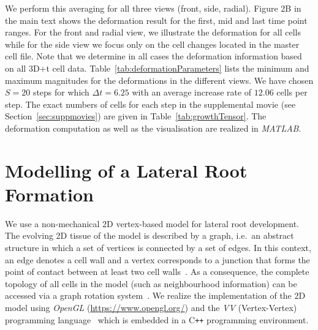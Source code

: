 \documentclass[11pt,a4paper, final]{article}
\begin{document}
We perform this averaging for all three views (front, side, radial). Figure 2B in the main text shows the deformation result for the first, mid and last time point ranges. For the front and radial view, we illustrate the deformation for all cells while for the side view we focus only on the cell changes located in the master cell file. Note that we determine in all cases the deformation information based on all 3D+t cell data. Table~\ref{tab:deformationParameters} lists the minimum and maximum magnitudes for the deformations in the different views. We have chosen $S=20$ steps for which $\Delta t = 6.25$ with an average increase rate of $12.06$ cells per step. The exact numbers of cells for each step in the supplemental movie (see Section~\ref{sec:suppmovies}) are given in Table~\ref{tab:growthTensor}. The deformation computation as well as the visualisation are realized in \textit{MATLAB}.

\clearpage
\section{Modelling of a Lateral Root Formation}
\noindent
We use a non-mechanical 2D vertex-based model for lateral root development. The evolving 2D tissue of the model is described by a graph, i.e.~an abstract structure in which a set of vertices is connected by a set of edges. In this context, an edge denotes a cell wall and a vertex corresponds to a junction that forms the point of contact between at least two cell walls~\cite{prusinkiewicz_lindenmayer_1990, prusinkiewicz_runions_2012}. As a consequence, the complete topology of all cells in the model (such as neighbourhood information) can be accessed via a graph rotation system~\cite{edmonds_1960}. We realize the implementation of the 2D model using \textit{OpenGL} (\href{https://www.opengl.org/}{https://www.opengl.org/}) and the \textit{VV} (Vertex-Vertex) programming language~\cite{smith_et_al_2004, smith_2006} which is embedded in a C{}\verb!++! programming environment.

\end{document}
